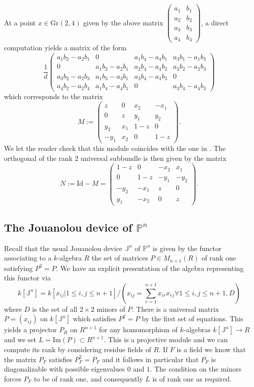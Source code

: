 \documentclass[11pt,leqno]{article}
\newcommand{\Proj}{{\mathbb P}}
\renewcommand{\1}{{\rm 1\hspace*{-0.4ex}%
\rule{0.1ex}{1.52ex}\hspace*{0.2ex}}}
\newcommand{\<}[1]{{\langle}#1 {\rangle}}
\theoremstyle{plain}
\theoremstyle{definition}
\theoremstyle{remark}
\numberwithin{equation}{section}
\begin{document}
At a point $x\in  \mathrm{Gr}(2,4)$ given by the above matrix $\begin{pmatrix} a_1 & b_1 \\ a_2 & b_2 \\ a_3 & b_3 \\ a_4 & b_4\end{pmatrix}$, a direct computation yields a matrix of the form
\[
\frac 1{d}\begin{pmatrix} a_1b_2-a_2b_1 & 0 & a_1b_4-a_4b_1 & a_3b_1-a_1b_3 \\ 0 & a_1b_2-a_2b_1 & a_2b_4-a_4b_2 & a_3b_2-a_2b_3 \\
a_3b_2-a_2b_3 & a_1b_3-a_3b_1 & a_3b_4-a_4b_3 & 0 \\ a_4b_2-a_2b_4 & a_1b_4-a_4b_1 & 0 & a_3b_4-a_4b_3\end{pmatrix}
\]
which corresponds to the matrix
\[
M:=\begin{pmatrix} z & 0 & x_2 & -x_1 \\ 0 & z & y_1 & y_2 \\
y_2 & x_1 & 1-z & 0 \\ -y_1 & x_2 & 0 & 1-z\end{pmatrix}.
\]
We let the reader check that this module coincides with the one in \cite[Example 4.3.8]{Asok14}.
The orthogonal of the rank $2$ universal subbundle is then given by the matrix
\[
N:=\mathrm{Id}-M=\begin{pmatrix} 1-z & 0 & -x_2 & x_1 \\ 0 & 1-z & -y_1 & -y_2 \\
-y_2 & -x_1 & z & 0 \\ y_1 & -x_2 & 0 & z\end{pmatrix}.
\]

\subsection{The Jouanolou device of $\mathbb{P}^n$}

Recall that the usual Jouanolou device $\mathbb{J}^n$ of $\Proj^n$ is given by the functor associating to a $k$-algebra $R$ the set of matrices $P\in M_{n+1}(R)$ of rank one satisfying $P^2=P$. We have an explicit presentation of the algebra representing this functor via
\[
k[\mathbb{J}^n]=k[x_{ij}\vert 1\leq i,j\leq n+1]/\left ( x_{ij}=\sum_{r=1}^{n+1} x_{ir}x_{rj}\forall 1\leq i,j\leq n+1, D\right)
\]
where $D$ is the set of all $2\times 2$ minors of $P$.
There is a universal matrix $P=(x_{ij})$ on $k[\mathbb{J}^n]$ which satisfies $P^2=P$ by the first set of equations. This yields a projector $P_R$ on $R^{n+1}$ for any homomorphism of $k$-algebras $k[\mathbb{J}^n]\to R$ and we set $L=\mathrm{Im}(P)\subset R^{n+1}$. This is a projective module and we can compute its rank by considering residue fields of $R$. If $F$ is a field we know that the matrix $P_F$ satisfies $P^2_F=P_F$ and it follows in particular that $P_F$ is diagonalizable with possible eigenvalues $0$ and $1$. The condition on the minors forces $P_F$ to be of rank one, and consequently $L$ is of rank one as required. 
\end{document}
